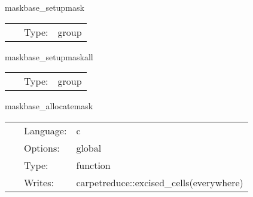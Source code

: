\vspace{5mm}


\hspace{5mm} maskbase\_setupmask 

\hspace{5mm}{\it set up the weight function } 


\hspace{5mm}

 \begin{tabular*}{160mm}{cll} 
~ & Type:  & group \\ 
\end{tabular*} 


\vspace{5mm}


\hspace{5mm} maskbase\_setupmaskall 

\hspace{5mm}{\it set up the weight function } 


\hspace{5mm}

 \begin{tabular*}{160mm}{cll} 
~ & Type:  & group \\ 
\end{tabular*} 


\vspace{5mm}


\hspace{5mm} maskbase\_allocatemask 

\hspace{5mm}{\it allocate the weight function } 


\hspace{5mm}

 \begin{tabular*}{160mm}{cll} 
~ & Language:  & c \\ 
~ & Options:  & global \\ 
~ & Type:  & function \\ 
~ & Writes:  & carpetreduce::excised\_cells(everywhere) \\ 
\end{tabular*} 


\vspace{5mm}


